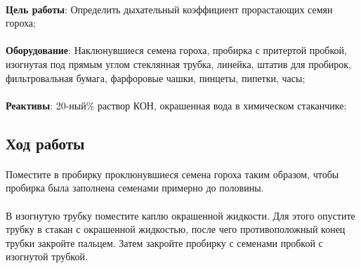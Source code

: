 



\begin{footnotesize}

\paragraph*{}\textbf{Цель работы}: Определить дыхательный коэффициент  прорастающих семян гороха;

\paragraph*{}\textbf{Оборудование}: Наклюнувшиеся семена гороха, пробирка с притертой пробкой, изогнутая под прямым углом стеклянная трубка, линейка, штатив
для пробирок, фильтровальная бумага, фарфоровые чашки, пинцеты, пипетки, часы;

\paragraph*{}\textbf{Реактивы}: 20-ный\% раствор КОН, окрашенная вода в
химическом стаканчике;

\end{footnotesize}

\subsection*{Ход работы}

\paragraph*{}Поместите в пробирку проклюнувшиеся семена гороха таким образом, чтобы пробирка была заполнена семенами примерно до половины. 

\paragraph*{}В изогнутую трубку поместите каплю окрашенной жидкости. Для этого опустите трубку в стакан с окрашенной жидкостью, после чего противоположный конец трубки закройте пальцем. Затем закройте пробирку с семенами пробкой с изогнутой трубкой.

